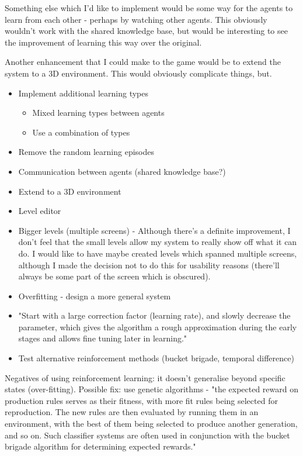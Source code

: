 \documentclass[a4paper,oneside]{report}
\begin{document}
Something else which I'd like to implement would be some way for the agents to learn from each other - perhaps by watching other agents. This obviously wouldn't work with the shared knowledge base, but would be interesting to see the improvement of learning this way over the original.

Another enhancement that I could make to the game would be to extend the system to a 3D environment. This would obviously complicate things, but.

\begin{itemize}
	\item Implement additional learning types
	\begin{itemize}
		\item Mixed learning types between agents
    	\item Use a combination of types
    \end{itemize}
    \item Remove the random learning episodes
    \item Communication between agents (shared knowledge base?)
    \item Extend to a 3D environment
    \item Level editor
    \item Bigger levels (multiple screens) - Although there's a definite improvement, I don't feel that the small levels allow my system to really show off what it can do. I would like to have maybe created levels which spanned multiple screens, although I made the decision not to do this for usability reasons (there'll always be some part of the screen which is obscured). 
    \item Overfitting - design a more general system
    \item "Start with a large correction factor (learning rate), and slowly decrease the parameter, which gives the algorithm a rough approximation during the early stages and allows fine tuning later in learning."
    \item Test alternative reinforcement methods (bucket brigade, temporal difference) 
\end{itemize}

Negatives of using reinforcement learning: it doesn't generalise beyond specific states (over-fitting). Possible fix: use genetic algorithms - "the expected reward on production rules serves as their fitness, with more fit rules being selected for reproduction. The new rules are then evaluated by running them in an environment, with the best of them being selected to produce another generation, and so on. Such classifier systems are often used in conjunction with the bucket brigade algorithm for determining expected rewards."
\end{document}
